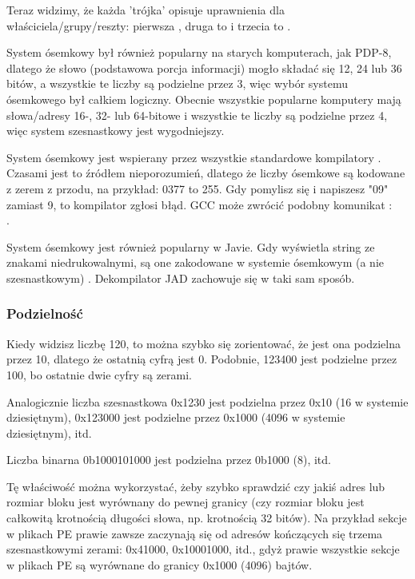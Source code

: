 Teraz widzimy, że każda 'trójka' opisuje uprawnienia dla właściciela/grupy/reszty: pierwsza , druga to  i trzecia to .

System ósemkowy był również popularny na starych komputerach, jak PDP-8, dlatego że słowo (podstawowa porcja informacji) mogło składać się 12, 24 lub
36 bitów, a wszystkie te liczby są podzielne przez 3, więc wybór systemu ósemkowego był całkiem logiczny.
Obecnie wszystkie popularne komputery mają słowa/adresy 16-, 32- lub 64-bitowe i wszystkie te liczby są podzielne przez 4,
więc system szesnastkowy jest wygodniejszy.

System ósemkowy jest wspierany przez wszystkie standardowe kompilatory \CCpp{}.
Czasami jest to źródłem nieporozumień, dlatego że liczby ósemkowe są kodowane z zerem z przodu, na przykład: 0377 to 255.
Gdy pomylisz się i napiszesz "09" zamiast 9, to kompilator zgłosi błąd.
GCC może zwrócić podobny komunikat :\\
.

System ósemkowy jest również popularny w Javie. Gdy \IDA wyświetla string ze znakami niedrukowalnymi, są one zakodowane w systemie ósemkowym (a nie szesnastkowym)
.
Dekompilator JAD zachowuje się w taki sam sposób.

\subsubsection{Podzielność}

Kiedy widzisz liczbę 120, to można szybko się zorientować, że jest ona podzielna przez 10, dlatego że ostatnią cyfrą jest 0.
Podobnie, 123400 jest podzielne przez 100, bo ostatnie dwie cyfry są zerami.

Analogicznie liczba szesnastkowa 0x1230 jest podzielna przez 0x10 (16 w systemie dziesiętnym), 0x123000 jest podzielne przez 0x1000 (4096 w systemie dziesiętnym), itd.

Liczba binarna 0b1000101000 jest podzielna przez 0b1000 (8), itd.

Tę właściwość można wykorzystać, żeby szybko sprawdzić
czy jakiś adres lub rozmiar bloku jest wyrównany do pewnej granicy (czy rozmiar bloku jest całkowitą krotnością długości słowa, np. krotnością 32 bitów).
Na przykład sekcje w plikach \ac{PE} prawie zawsze zaczynają się od adresów kończących się trzema szesnastkowymi zerami: 0x41000, 0x10001000, itd., gdyż prawie wszystkie sekcje w plikach \ac{PE} są wyrównane do granicy 0x1000 (4096) bajtów.

